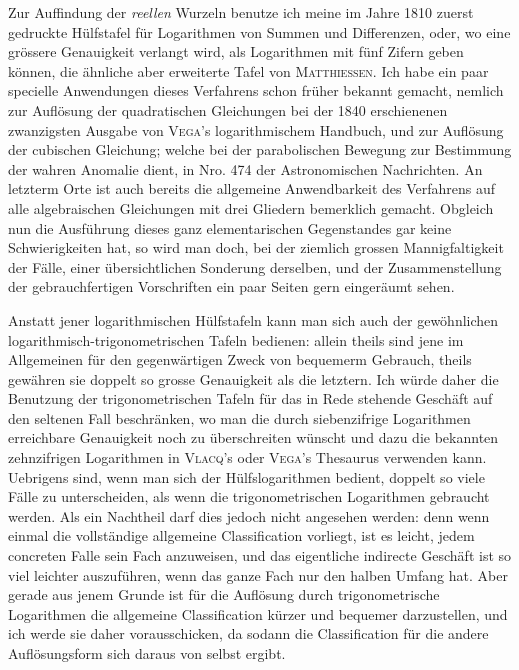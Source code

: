 Zur Auffindung der \textit{reellen} Wurzeln benutze ich meine im Jahre 1810 zuerst
gedruckte Hülfstafel für Logarithmen von Summen und Differenzen, oder, wo
eine grössere Genauigkeit verlangt wird, als Logarithmen mit fünf Zifern geben
können, die ähnliche aber erweiterte Tafel von \textsc{Matthiessen}. Ich habe ein paar
specielle Anwendungen dieses Verfahrens schon früher bekannt gemacht, nemlich
zur Auflösung der quadratischen Gleichungen bei der 1840 erschienenen zwanzigsten Ausgabe von \textsc{Vega}'s logarithmischem Handbuch, und zur Auflösung der
cubischen Gleichung; welche bei der parabolischen Bewegung zur Bestimmung
der wahren Anomalie dient, in Nro. 474 der Astronomischen Nachrichten. An
letzterm Orte ist auch bereits die allgemeine Anwendbarkeit des Verfahrens auf
alle algebraischen Gleichungen mit drei Gliedern bemerklich gemacht. Obgleich
nun die Ausführung dieses ganz elementarischen Gegenstandes gar keine Schwierigkeiten hat, so wird man doch, bei der ziemlich grossen Mannigfaltigkeit der
Fälle, einer übersichtlichen Sonderung derselben, und der Zusammenstellung der
gebrauchfertigen Vorschriften ein paar Seiten gern eingeräumt sehen.

Anstatt jener logarithmischen Hülfstafeln kann man sich auch der gewöhnlichen logarithmisch-trigonometrischen Tafeln bedienen: allein theils sind jene
im Allgemeinen für den gegenwärtigen Zweck von bequemerm Gebrauch, theils
gewähren sie doppelt so grosse Genauigkeit als die letztern. Ich würde daher die
Benutzung der trigonometrischen Tafeln für das in Rede stehende Geschäft auf
den seltenen Fall beschränken, wo man die durch siebenzifrige Logarithmen erreichbare Genauigkeit noch zu überschreiten wünscht und dazu die bekannten
zehnzifrigen Logarithmen in \textsc{Vlacq}'s oder \textsc{Vega}'s Thesaurus verwenden kann.
Uebrigens sind, wenn man sich der Hülfslogarithmen bedient, doppelt so viele
Fälle zu unterscheiden, als wenn die trigonometrischen Logarithmen gebraucht
werden. Als ein Nachtheil darf dies jedoch nicht angesehen werden: denn wenn
einmal die vollständige allgemeine Classification vorliegt, ist es leicht, jedem concreten Falle sein Fach anzuweisen, und das eigentliche indirecte Geschäft ist so
viel leichter auszuführen, wenn das ganze Fach nur den halben Umfang hat. Aber
gerade aus jenem Grunde ist für die Auflösung durch trigonometrische Logarithmen die allgemeine Classification kürzer und bequemer darzustellen, und ich werde
sie daher vorausschicken, da sodann die Classification für die andere Auflösungsform sich daraus von selbst ergibt.

